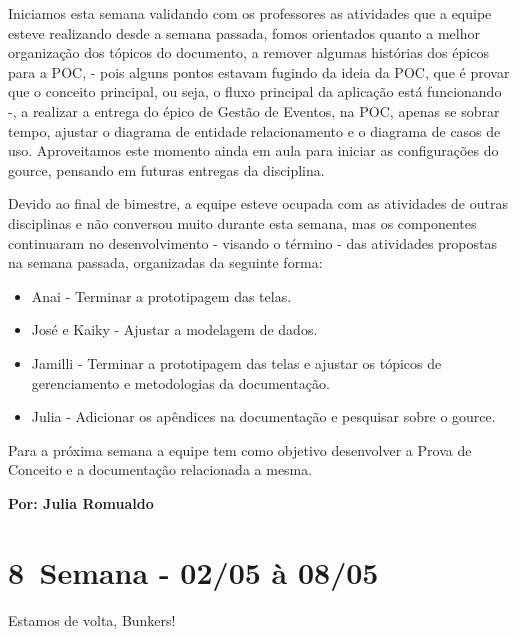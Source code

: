 Iniciamos esta semana validando com os professores as atividades que a equipe esteve realizando desde a semana passada, fomos orientados quanto a melhor organização dos tópicos do documento, a remover algumas histórias dos épicos para a \acs{POC}, - pois alguns pontos estavam fugindo da ideia da \acs{POC}, que é provar que o conceito principal, ou seja, o fluxo principal da aplicação está funcionando -, a realizar a entrega do épico de Gestão de Eventos, na \acs{POC}, apenas se sobrar tempo, ajustar o diagrama de entidade relacionamento e o diagrama de casos de uso. Aproveitamos este momento ainda em aula para iniciar as configurações do \gls{gource}, pensando em futuras entregas da disciplina.

Devido ao final de bimestre, a equipe esteve ocupada com as atividades de outras disciplinas e não conversou muito durante esta semana, mas os componentes continuaram no desenvolvimento - visando o término - das atividades propostas na semana passada, organizadas da seguinte forma:

\begin{itemize}
    \item Anai - Terminar a prototipagem das telas.
    \item José e Kaiky - Ajustar a modelagem de dados.
    \item Jamilli - Terminar a prototipagem das telas e ajustar os tópicos de gerenciamento e metodologias da documentação. 
    \item Julia - Adicionar os apêndices na documentação e pesquisar sobre o \gls{gource}.
\end{itemize}
\noindent Para a próxima semana a equipe tem como objetivo desenvolver a Prova de Conceito e a documentação relacionada a mesma.

\textbf{Por: Julia Romualdo}

\section{8\textordfeminine \, Semana - 02/05 à 08/05}
Estamos de volta, Bunkers!

